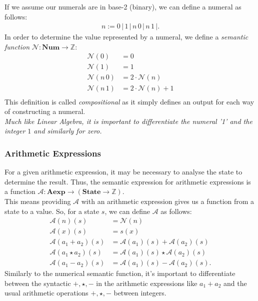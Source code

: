 \documentclass[a4paper, 12pt, twoside]{article}
\begin{document}
If we assume our numerals are in base-2 (binary), we can define a numeral
as follows: \begin{gather*}
  n := 0 \, | \, 1 \, | \, n \, 0 \, | \, n \, 1 \, |.
\end{gather*} In order to determine the value represented by a numeral, we
define a \textit{semantic function} $\mathcal{N} : \textbf{Num} \to \mathbb{Z}$:
\begin{align*}
  \mathcal{N}(0) &= 0 \\
  \mathcal{N}(1) &= 1 \\
  \mathcal{N}(n \, 0) &= 2 \cdot \mathcal{N}(n) \\
  \mathcal{N}(n \, 1) &= 2 \cdot \mathcal{N}(n) + 1 \\
\end{align*} This definition is called \textit{compositional} as it simply
defines an output for each way of constructing a numeral.
\\[\baselineskip]
\textit{Much like Linear Algebra, it is important to differentiate
the numeral '1' and the integer $1$ and similarly for zero.}

\subsubsection{Arithmetic Expressions}

For a given arithmetic expression, it may be necessary to analyse the state
to determine the result. Thus, the semantic expression for arithmetic
expressions is a function $\mathcal{A} : \textbf{Aexp} \to (\textbf{State} 
\to \mathbb{Z})$. 
\\[\baselineskip]
This means providing $\mathcal{A}$ with an arithmetic
expression gives us a function from a state to a value. So, for a state $s$,
we can define $\mathcal{A}$ as follows: \begin{align*}
  \mathcal{A}(n)(s) &= \mathcal{N}(n) \\
  \mathcal{A}(x)(s) &= s(x) \\
  \mathcal{A}(a_1 + a_2)(s) &= \mathcal{A}(a_1)(s) + \mathcal{A}(a_2)(s) \\
  \mathcal{A}(a_1 \star a_2)(s) &= \mathcal{A}(a_1)(s) \star \mathcal{A}(a_2)(s) \\
  \mathcal{A}(a_1 - a_2)(s) &= \mathcal{A}(a_1)(s) - \mathcal{A}(a_2)(s).
\end{align*} Similarly to the numerical semantic function, it's important
to differentiate between the syntactic $+, \star, -$ in the arithmetic
expressions like $a_1 + a_2$ and the usual arithmetic operations $+, \star, -$
between integers.
\end{document}

